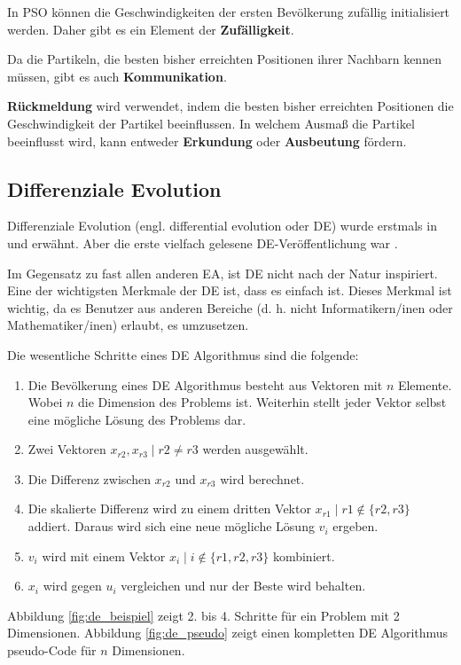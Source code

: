 \documentclass[twoside,twocolumn]{article}
\begin{document}
In PSO können die Geschwindigkeiten der ersten Bevölkerung zufällig initialisiert werden. Daher gibt es ein Element der \textbf{Zufälligkeit}.\par
Da die Partikeln, die besten bisher erreichten Positionen ihrer Nachbarn kennen müssen, gibt es auch \textbf{Kommunikation}.\par
\textbf{Rückmeldung} wird verwendet, indem die besten bisher erreichten Positionen die Geschwindigkeit der Partikel beeinflussen. In welchem Ausmaß die Partikel beeinflusst wird, kann entweder \textbf{Erkundung} oder \textbf{Ausbeutung} fördern.

\subsection{Differenziale Evolution}
Differenziale Evolution (engl. differential evolution oder DE) wurde erstmals in \cite{storn_de_a} und \cite{storn_de_b} erwähnt. Aber die erste vielfach gelesene DE-Veröffentlichung war \cite{price_storn_de}.\par
Im Gegensatz zu fast allen anderen EA, ist DE nicht nach der Natur inspiriert. Eine der wichtigsten Merkmale der DE ist, dass es einfach ist. Dieses Merkmal ist wichtig, da es Benutzer aus anderen Bereiche (d. h. nicht Informatikern/inen oder Mathematiker/inen) erlaubt, es umzusetzen.\par
Die wesentliche Schritte eines DE Algorithmus sind die folgende:

\begin{enumerate}
\item Die Bevölkerung eines DE Algorithmus besteht aus Vektoren mit $n$ Elemente. Wobei $n$ die Dimension des Problems ist. Weiterhin stellt jeder Vektor selbst eine mögliche Lösung des Problems dar.
\item Zwei Vektoren $x_{r2}, x_{r3} \mid r2 \neq r3$ werden ausgewählt.
\item Die Differenz zwischen $x_{r2}$ und $x_{r3}$ wird berechnet.
\item Die skalierte Differenz wird zu einem dritten Vektor $x_{r1} \mid r1 \notin \{ r2, r3 \}$ addiert. Daraus wird sich eine neue mögliche Lösung $v_i$ ergeben.
\item $v_i$ wird mit einem Vektor $x_i \mid i \notin \{ r1, r2, r3 \}$ kombiniert.
\item $x_i$ wird gegen $u_i$ vergleichen und nur der Beste wird behalten.
\end{enumerate}

Abbildung \ref{fig:de_beispiel} zeigt 2. bis 4. Schritte für ein Problem mit 2 Dimensionen. Abbildung \ref{fig:de_pseudo} zeigt einen kompletten DE Algorithmus pseudo-Code für $n$ Dimensionen.\par
\end{document}
